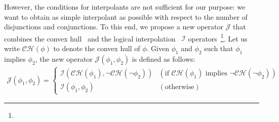 However, the conditions for interpolants are not sufficient for our 
purpose: we want to obtain as simple interpolant as possible with 
respect to the number of disjunctions and conjunctions.  To this end, we 
propose a new operator \(\mathcal{J}\) that combines the convex 
hull~\cite{} and the logical interpolation~\cite{} \(\mathcal{I}\) 
operators~\footnote{}.  Let us 
write \(\mathcal{CH}(\phi)\) to denote the convex hull of \(\phi\).  
Given \(\phi_1\) and \(\phi_2\) such that \(\phi_1\) implies \(\phi_2\), 
the new operator \(\mathcal{J}(\phi_1,\phi_2)\) is defined as follows:
\begin{eqnarray*}
\mathcal{J}(\phi_1,\phi_2) =
\left\{
\begin{array}{ll}
\mathcal{I}(\mathcal{CH}(\phi_1),\neg \mathcal{CH}(\neg \phi_2)) & (\mbox{if~}\mathcal{CH}(\phi_1)\mbox{~implies~}\neg \mathcal{CH}(\neg \phi_2)) \\
\mathcal{I}(\phi_1,\phi_2) & (\mbox{otherwise})
\end{array}
\right.
\end{eqnarray*}

%
